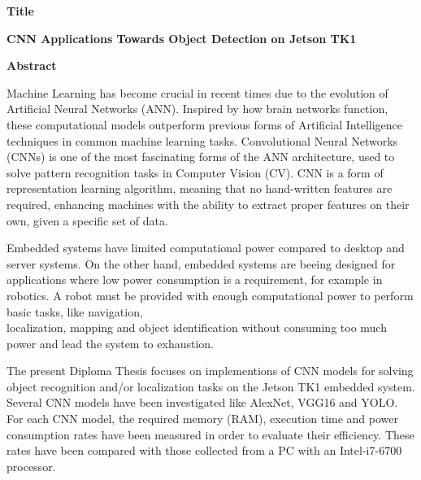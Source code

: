 {\selectfont

{}


\begin{center}
  \centering
  \textbf{\Large{Title}}
  \vspace{0.5cm}

  \textbf{\large{CNN Applications Towards Object Detection on Jetson TK1}}

  \vspace{1cm}

  \centering
  \textbf{Abstract}
\end{center}

Machine Learning has become crucial in recent times due to the evolution of
Artificial Neural Networks (ANN). Inspired by how brain networks function,
these computational models outperform previous forms of Artificial Intelligence
techniques in common machine learning tasks.
Convolutional Neural Networks (CNNs) is one of the most fascinating forms of the ANN architecture,
used to solve pattern recognition tasks in Computer Vision (CV).
CNN is a form of representation learning algorithm, meaning that no
hand-written features are required, enhancing machines with the ability
to extract proper features on their own, given a specific set of data.

Embedded systems have limited computational power compared to
desktop and server systems. On the other hand, embedded systems are beeing
designed for applications where low power consumption is a requirement,
for example in robotics. A robot must be provided with enough computational
power to perform basic tasks, like navigation, \\ localization, mapping
and object identification without consuming too much power and lead the
system to exhaustion.

The present Diploma Thesis focuses on implementions of CNN models for solving
object recognition and/or localization tasks on the Jetson TK1 embedded system.
Several CNN models have been investigated like AlexNet, VGG16 and YOLO.
For each CNN model, the required memory (RAM), execution time and power consumption
rates have been measured in order to evaluate their efficiency. These rates have
been compared with those collected from a PC with an Intel-i7-6700 processor.

}
